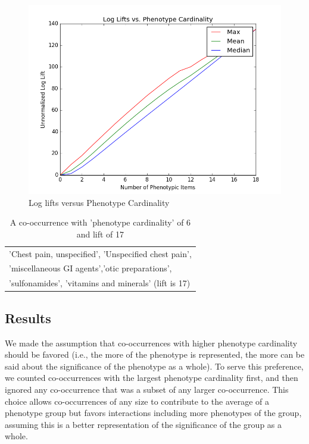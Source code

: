 \documentclass{sig-alternate-05-2015}
\begin{document}
\begin{figure} [t]
\centering
\includegraphics[width=\linewidth]{logLiftsAcrossPhenoCard_MMM_kho.png}
\caption{Log lifts versus Phenotype Cardinality}
\label{fig:log-lift}
\end{figure}

\begin{table}
\begin{center}
\begin{tabular}{l}
\toprule
'Chest pain, unspecified', 'Unspecified chest pain',\\
 'miscellaneous GI agents','otic preparations',\\
 'sulfonamides', 'vitamins and minerals' (lift is 17) \\
\bottomrule
\end{tabular}
\end{center}
\caption{A co-occurrence with 'phenotype cardinality' of 6 and lift of 17}
\label{tab:phenoCard}
\end{table}

\subsection{Results}

We made the assumption that co-occurrences with higher phenotype cardinality should be favored (i.e., the more of the phenotype is represented, the more can be said about the significance of the phenotype as a whole). 
To serve this preference, we counted co-occurrences with the largest phenotype cardinality first, and then ignored any co-occurrence that was a subset of any larger co-occurrence. 
This choice allows co-occurrences of any size to contribute to the average of a phenotype group but favors interactions including more phenotypes of the group, assuming this is a better representation of the significance of the group as a whole.
\end{document}

